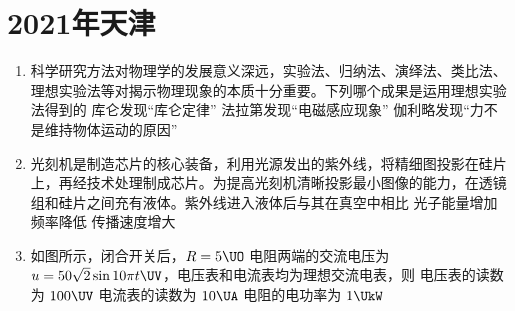 \documentclass[\gkver]{gaokaozhenti}
\begin{document}
\chapter{2021年天津}

\begin{enumerate}
\item
科学研究方法对物理学的发展意义深远，实验法、归纳法、演绎法、类比法、理想实验法等对揭示物理现象的本质十分重要。下列哪个成果是运用理想实验法得到的 
{库仑发现“库仑定律”}
{法拉第发现“电磁感应现象”}
{伽利略发现“力不是维持物体运动的原因”}


\item
光刻机是制造芯片的核心装备，利用光源发出的紫外线，将精细图投影在硅片上，再经技术处理制成芯片。为提高光刻机清晰投影最小图像的能力，在透镜组和硅片之间充有液体。紫外线进入液体后与其在真空中相比 
{光子能量增加}
{频率降低}
{传播速度增大}


\item
如图所示，闭合开关后，$R = 5 \UO$ 电阻两端的交流电压为 $u = 50\sqrt{2}\sin 10\pi t \UV$，电压表和电流表均为理想交流电表，则 
{电压表的读数为 $100 \UV$}
{电流表的读数为 $10 \UA$}
{电阻的电功率为 $1 \UkW$}

\end{enumerate}
\end{document}
